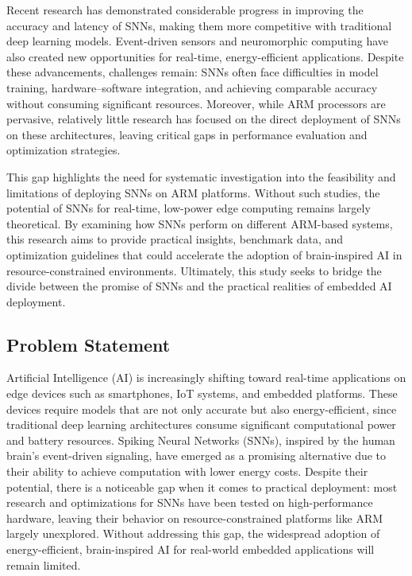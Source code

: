 \documentclass[a4paper,12pt]{article}
\begin{document}
	Recent research has demonstrated considerable progress in improving the accuracy and latency of SNNs, making them more competitive with traditional deep learning models. Event-driven sensors and neuromorphic computing have also created new opportunities for real-time, energy-efficient applications. Despite these advancements, challenges remain: SNNs often face difficulties in model training, hardware–software integration, and achieving comparable accuracy without consuming significant resources. Moreover, while ARM processors are pervasive, relatively little research has focused on the direct deployment of SNNs on these architectures, leaving critical gaps in performance evaluation and optimization strategies.
	
	This gap highlights the need for systematic investigation into the feasibility and limitations of deploying SNNs on ARM platforms. Without such studies, the potential of SNNs for real-time, low-power edge computing remains largely theoretical. By examining how SNNs perform on different ARM-based systems, this research aims to provide practical insights, benchmark data, and optimization guidelines that could accelerate the adoption of brain-inspired AI in resource-constrained environments. Ultimately, this study seeks to bridge the divide between the promise of SNNs and the practical realities of embedded AI deployment.
	
	\subsection{Problem Statement}
	Artificial Intelligence (AI) is increasingly shifting toward real-time applications on edge devices such as smartphones, IoT systems, and embedded platforms. These devices require models that are not only accurate but also energy-efficient, since traditional deep learning architectures consume significant computational power and battery resources. Spiking Neural Networks (SNNs), inspired by the human brain’s event-driven signaling, have emerged as a promising alternative due to their ability to achieve computation with lower energy costs. Despite their potential, there is a noticeable gap when it comes to practical deployment: most research and optimizations for SNNs have been tested on high-performance hardware, leaving their behavior on resource-constrained platforms like ARM largely unexplored. Without addressing this gap, the widespread adoption of energy-efficient, brain-inspired AI for real-world embedded applications will remain limited.
	
\end{document}
